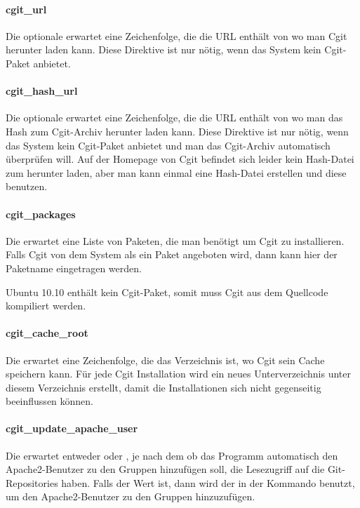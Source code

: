 \paragraph{cgit\_url}

Die optionale  erwartet eine Zeichenfolge, die die URL
enthält von wo man Cgit herunter laden kann. Diese Direktive ist nur nötig, wenn
das System kein Cgit-Paket anbietet.

\paragraph{cgit\_hash\_url}

Die optionale  erwartet eine Zeichenfolge, die die
URL enthält von wo man das Hash zum Cgit-Archiv herunter laden kann. Diese
Direktive ist nur nötig, wenn das System kein Cgit-Paket anbietet und man das
Cgit-Archiv automatisch überprüfen will. Auf der Homepage von Cgit befindet sich
leider kein Hash-Datei zum herunter laden, aber man kann einmal eine Hash-Datei
erstellen und diese benutzen.

\paragraph{cgit\_packages}

Die  erwartet eine Liste von Paketen, die man benötigt
um Cgit zu installieren. Falls Cgit von dem System als ein Paket angeboten wird,
dann kann hier der Paketname eingetragen werden.

Ubuntu 10.10 enthält kein Cgit-Paket, somit muss Cgit aus dem Quellcode
kompiliert werden.

\paragraph{cgit\_cache\_root}

Die  erwartet eine Zeichenfolge, die das
Verzeichnis ist, wo Cgit sein Cache speichern kann. Für jede Cgit Installation
wird ein neues Unterverzeichnis unter diesem Verzeichnis erstellt, damit die
Installationen sich nicht gegenseitig beeinflussen können.

\paragraph{cgit\_update\_apache\_user}

Die  erwartet entweder  oder
, je nach dem ob das Programm automatisch den Apache2-Benutzer zu
den Gruppen hinzufügen soll, die Lesezugriff auf die Git-Repositories haben.
Falls der Wert  ist, dann wird der in der
 Kommando benutzt, um den Apache2-Benutzer zu den
Gruppen hinzuzufügen.
